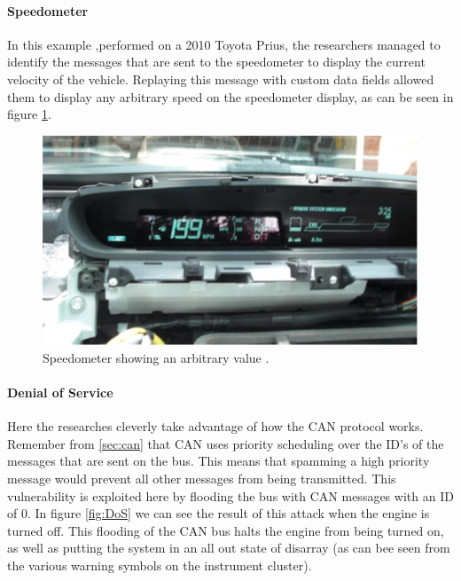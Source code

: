 \documentclass[11pt]{article}
\begin{document}
\paragraph{Speedometer} In this example ,performed on a 2010 Toyota Prius, the researchers managed to identify the messages that are sent to the speedometer to display the current velocity of the vehicle. Replaying this message with custom data fields allowed them to display any arbitrary speed on the speedometer display, as can be seen in figure \ref{fig:speedometer}.

\begin{figure}[h]
	\label{fig:speedometer}
	\centering
	\includegraphics[width=\textwidth]{speedometer.png}
	\caption{Speedometer showing an arbitrary value \cite{MillerC}.}
\end{figure}

\paragraph{Denial of Service} Here the researches cleverly take advantage of how the CAN protocol works. Remember from \ref{sec:can} that CAN uses priority scheduling over the ID's of the messages that are sent on the bus. This means that spamming a high priority message would prevent all other messages from being transmitted. This vulnerability is exploited here by flooding the bus with CAN messages with an ID of 0. In figure \ref{fig:DoS} we can see the result of this attack when the engine is turned off. This flooding of the CAN bus halts the engine from being turned on, as well as putting the system in an all out state of disarray (as can bee seen from the various warning symbols on the instrument cluster).
 
\end{document}
